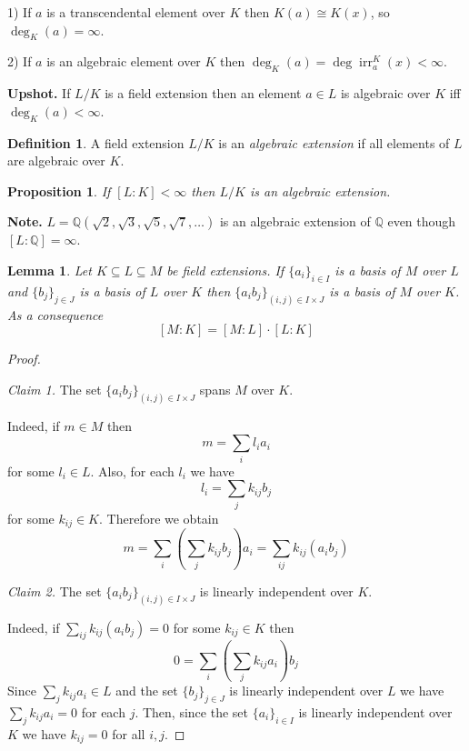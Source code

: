 \documentclass[12pt, letterpaper, oneside]{article}
\theoremstyle{plain}
\newtheorem{lemma}[theorem]{Lemma}
\newtheorem{proposition}[theorem]{Proposition}
\theoremstyle{definition}
\newtheorem{definition}[theorem]{Definition}
\newcommand{\Q}{{\mathbb Q}}
\newcommand{\irr}{\operatorname{irr}}
\newcommand{\vs}{\vskip 5mm}
\begin{document}
1) If $a$ is a transcendental element over $K$ then $K(a) \cong K(x)$, so $\deg_{K}(a) = \infty$. 

2) If $a$ is an algebraic element over $K$ then $\deg_{K}(a) = \deg \irr^{K}_{a}(x) < \infty$. 

\vs\vs

\textbf{Upshot.} If $L/K$ is a field extension then an element $a\in L$ is algebraic over $K$
iff $\deg_{K}(a) < \infty$.


\vs\vs


\begin{definition}
A field extension $L/K$ is an \emph{algebraic extension} if all elements of $L$ are algebraic 
over $K$.
\end{definition}


\vs\vs

\begin{proposition}
\label{PROP_FINEXTAREALG}
If $[L:K] < \infty$ then $L/K$ is an algebraic extension. 
\end{proposition}


\vs\vs

\textbf{Note.}  $L= \Q(\sqrt{2}, \sqrt{3}, \sqrt{5}, \sqrt{7}, \dots)$ is an algebraic extension of
$\Q$ even though $[L:\Q] = \infty$.


\vs\vs

\begin{lemma}
\label{LEMMA_EXTDEGFORMULA}
Let $K\subseteq L \subseteq M$ be field extensions. If $\{a_{i}\}_{i\in I}$ is a basis of 
$M$ over $L$ and $\{b_{j}\}_{j\in J}$ is a basis of $L$ over $K$ then $\{a_{i}b_{j}\}_{(i, j)\in I\times J}$
is a basis of $M$ over $K$. As a consequence 
$$[M:K] = [M:L]\cdot [L:K]$$
\end{lemma}



\vs\vs

\begin{proof} \ 


 \emph{Claim 1.} The set $\{a_{i}b_{j}\}_{(i, j)\in I\times J}$ spans $M$ over $K$.
 
 
 Indeed, if $m\in M$ then 
 $$m = \sum_{i} l_{i}a_{i}$$
 for some $l_{i}\in L$. Also, for each $l_{i}$ we have 
 $$l_{i} = \sum_{j} k_{ij}b_{j}$$
 for some $k_{ij}\in K$. Therefore we obtain
 $$m = \sum_{i} \left(\sum_{j}k_{ij}b_{j}\right)a_{i} = \sum_{ij}k_{ij}(a_{i}b_{j})$$ 
 
 \vs
 
 
 \emph{Claim 2.}  The set $\{a_{i}b_{j}\}_{(i, j)\in I\times J}$ is linearly independent over $K$.
 
 
 Indeed, if $\sum_{ij}k_{ij}(a_{i}b_{j}) = 0$ for some $k_{ij}\in K$ then 
 $$0 = \sum_{i}\left(\sum_{j} k_{ij} a_{i}\right) b_{j}$$
 Since $\sum_{j} k_{ij} a_{i} \in L$ and the set $\{b_{j}\}_{j\in J}$ is linearly independent over 
 $L$ we have $\sum_{j} k_{ij} a_{i} = 0$ for each $j$. Then, since the set $\{a_{i}\}_{i\in I}$
 is linearly independent over $K$ we have $k_{ij} = 0$ for all $i, j$. 
 
 
\end{proof}
\end{document}
